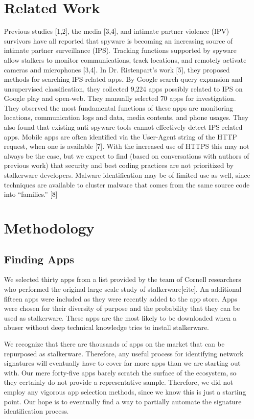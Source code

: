 \documentclass[acmtog]{acmart}
\begin{document}
\section{Related Work}
Previous studies [1,2], the media [3,4], and intimate partner violence (IPV) 
survivors have all reported that spyware is becoming an increasing source of 
intimate partner surveillance (IPS). Tracking functions supported by spyware 
allow stalkers to monitor communications, track locations, and remotely 
activate cameras and microphones [3,4]. In Dr. Ristenpart’s work [5], they 
proposed methods for searching IPS-related apps. By Google search query 
expansion and unsupervised classification, they collected 9,224 apps possibly 
related to IPS on Google play and open-web. They manually selected 70 apps for 
investigation. They observed the most fundamental functions of these apps are 
monitoring locations, communication logs and data, media contents, and phone 
usages. They also found that existing anti-spyware tools cannot effectively 
detect IPS-related apps.
Mobile apps are often identified via the User-Agent string of the HTTP request, 
when one is available [7]. With the increased use of HTTPS this may not always 
be the case, but we expect to find (based on conversations with authors of 
previous work) that security and best coding practices are not prioritized by 
stalkerware developers. Malware identification may be of limited use as well, 
since techniques are available to cluster malware that comes from the same 
source code into “families.” [8]

\section{Methodology}
\subsection{Finding Apps}
We selected thirty apps from a list provided by the team of Cornell researchers 
who performed the original large scale study of stalkerware[cite]. An 
additional fifteen apps were included as they were recently added to the app 
store. Apps were chosen for their diversity of purpose and the probability that 
they can be used as stalkerware. These apps are the most likely to be 
downloaded when a abuser without deep technical knowledge tries to install 
stalkerware. 

We recognize that there are thousands of apps on the market that can be 
repurposed as stalkerware. Therefore, any useful process for identifying 
network signatures will eventually have to cover far more apps than we are 
starting out with. Our mere forty-five apps barely scratch the surface of the 
ecosystem, so they certainly do not provide a representative sample. Therefore, 
we did not employ any vigorous app selection methods, since we know this is 
just a starting point. Our hope is to eventually find a way to partially 
automate the signature identification process.
\end{document}
